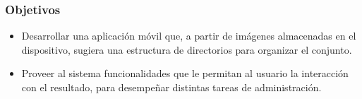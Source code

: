 \begin{frame}[t,fragile]
	\frametitle {Objetivos}


	\begin{itemize}
		\item Desarrollar una aplicación móvil que, a partir de imágenes almacenadas en el dispositivo, sugiera una estructura de directorios para organizar el conjunto.
		
		\item Proveer al sistema funcionalidades que le permitan al usuario la interacción con el resultado, para desempeñar distintas tareas de administración.
	\end{itemize}
	
	
	


\end{frame}

